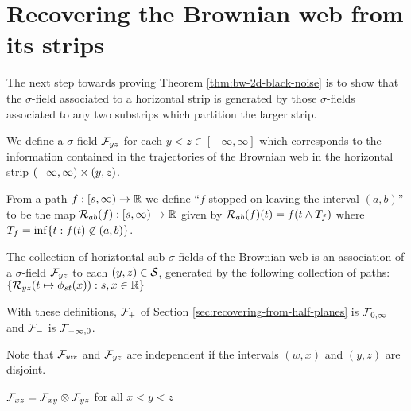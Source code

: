 {
\section{Recovering the Brownian web from its strips}

The next step towards proving Theorem \ref{thm:bw-2d-black-noise} is
to show that the $\sigma$-field associated to a horizontal strip is
generated by those $\sigma$-fields associated to any two substrips
which partition the larger strip.

We define a $\sigma$-field $\mathcal{F}_{y z}$ for each $y < z \in
[-\infty, \infty]$ which corresponds to the information contained in
the trajectories of the Brownian web in the horizontal strip
$(-\infty, \infty) \times (y,z)$.

\newcommand{\brownianwebnoise}{collection of horiztontal
  sub-$\sigma$-fields of the Brownian web}

\begin{definition}
  \newcommand{\T}{\stripleavetime{f}}
  \label{def:restrict}
  From a path $f : [s, \infty) \to \mathbb{R}$ we define ``$f$ stopped on
    leaving the interval $(a,b)$'' to be the map $\mathcal{R}_{{a}{b}}(f) : [s,
      \infty) \to \mathbb{R}$ given by $\restrict{a}{b}{f}(t) = f(t \minsym \T)$
      where $\T = \inf\{ t : f(t) \not\in (a,b) \}$.

  \label{def:horizontal-factorization}
  The \brownianwebnoise{} is an
  association of a $\sigma$-field $\mathcal{F}_{y z}$ to each $(y, z)
  \in \mathcal{S}$, generated by the following collection of paths:
  $\{ \mathcal{R}_{{y}{z}}(t \mapsto \phi_{{s}{t}}(x)) : s, x \in \mathbb{R} \}$
\end{definition}


With these definitions, $\mathcal{F}_{+}$ of Section \ref{sec:recovering-from-half-planes} is
$\mathcal{F}_{0,\infty}$ and $\mathcal{F}_{-}$ is
$\mathcal{F}_{-\infty,0}$.

\begin{observation}
  Note that $\mathcal{F}_{w x}$ and $\mathcal{F}_{y z}$ are independent if the
  intervals $(w,x)$ and $(y,z)$ are disjoint.
\end{observation}

\renewcommand{\top}{b}
\newcommand{\bottom}{a}

\begin{theorem}\label{thm:recoveringfromstrips}
  $\mathcal{F}_{x z} = \mathcal{F}_{x y} \otimes \mathcal{F}_{y z}$ for all $x < y < z$
\end{theorem}

}
